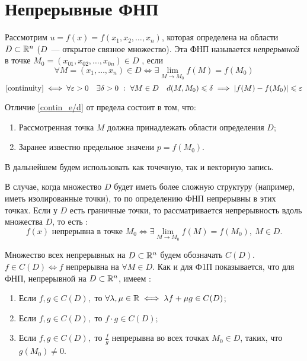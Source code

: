 \documentclass[../../main.tex]{subfiles}
\begin{document}
	
	\section{Непрерывные ФНП}	
	
	Рассмотрим $u = f(x) = f(x_1, x_2, \ldots, x_n)$, которая 
	определена на области
	$D \subset \mathbb{R}^n$ ($D$~--- открытое связное множество). Эта ФНП называется
	\emph{непрерывной} в точке $M_0 = (x_{01}, x_{02}, \ldots, x_{0n}) \in D$
	, если
	\begin{equation}
	\label{continuity}
	\forall M = (x_1, \ldots, x_n) \in D \iff \exists 
	\lim\limits_{M \to M_0}f(M) = f(M_0)
	\end{equation}
	\begin{equation}
	\label{contin_e/d}
	\eqref{continuity} \iff \forall \eps > 0 \quad \exists \delta > 0 \ : \ 
	\forall M \in D \quad
	d(M, M_0) \leq \delta \implies |f(M) - f(M_0)| \leq \eps
	\end{equation}
	
	Отличие \eqref{contin_e/d} от предела состоит в том, что:
	\begin{enumerate}
		\item  Рассмотренная точка $M$ должна принадлежать области 
		       определения $D$;
		\item Заранее известно предельное значени $p = f(M_0)$.
	\end{enumerate}
	
    В дальнейшем будем использовать как точечную, так и векторную запись.
    
    В случае, когда множество $D$ будет иметь более сложную структуру 
    (например, иметь изолированные точки), то по определению ФНП 
    непрерывны в этих
    точках. Если у $D$ есть граничные точки, то рассматривается непрерывность 
    вдоль множества $D$, то есть :
    \[
      f(x) \text{ непрерывна в точке } M_0 \iff \exists \lim\limits_{M \to M_0}
       f(M) = f(M_0), \ M \in D.
    \]
    
    Множество всех непрерывных на $D \subset \mathbb{R}^n$ будем обозначать $C(D)$.
    $f \in C(D) \iff f$ непрерывна на $\forall M \in D$. Как и для Ф1П 
    показывается, что для ФНП, непрерывной на $D \subset \mathbb{R}^n$, имеем :
    \begin{enumerate}
    	\item Если $f, g \in C(D),$ то $\forall \lambda, \mu \in \mathbb{R} \iff 
    	      \lambda f + \mu g \in C(D)$;
    	\item Если $f, g \in C(D),$ то $f \cdot g \in C(D)$;
    	\item Если $f, g \in C(D),$ то $\frac{f}{g}$ непрерывна  во всех точках 
        $M_0 \in D$, таких, что  $g(M_0) \ne 0$.
    \end{enumerate}
    
\end{document}
